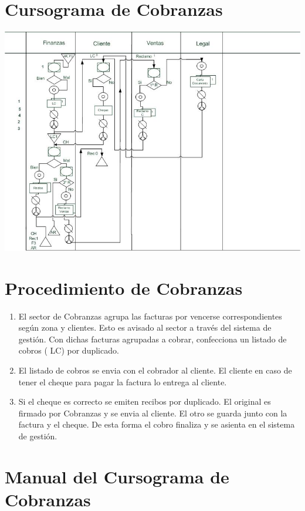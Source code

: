 \section{Cursograma de Cobranzas}
\includegraphics[scale=0.7]{Empresa/Circuitos/Cobranzas/cursograma-manual-cobranzas.jpg}

\pagebreak
\section{Procedimiento de Cobranzas}
\begin{enumerate}
  \item El sector de Cobranzas agrupa las facturas por vencerse correspondientes seg\'un zona y clientes. Esto es avisado al sector a trav\'es del sistema de gesti\'on. Con dichas facturas agrupadas a cobrar, confecciona un listado de cobros ( LC) por duplicado.
  \item El listado de cobros se envia con el cobrador al cliente. El cliente en caso de tener el cheque para pagar la factura lo entrega al cliente.
  \item Si el cheque es correcto se emiten recibos por duplicado. El original es firmado por Cobranzas y se envia al cliente. El otro se guarda junto con la factura y el cheque. De esta forma el cobro finaliza y se asienta en el sistema de gesti\'on.
\end{enumerate}

\pagebreak
\section{Manual del Cursograma de Cobranzas}


